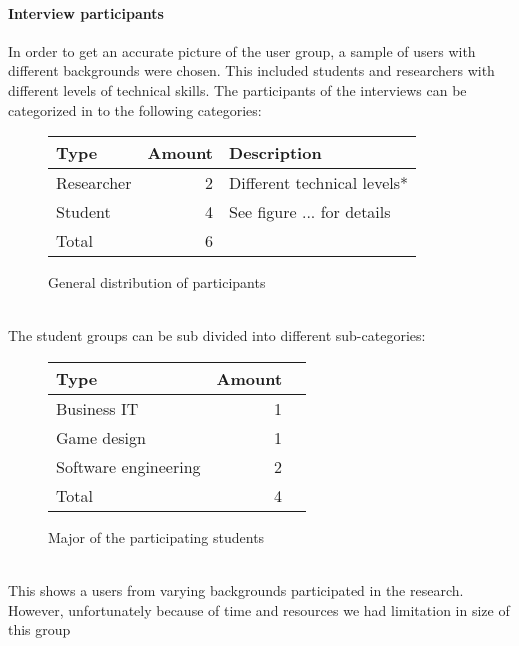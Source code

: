 \documentclass[conference]{IEEEtran}
\begin{document}
		\paragraph{Interview participants}
			In order to get an accurate picture of the user group, a sample of users with different backgrounds were chosen. This included students and researchers with different levels of technical skills. The participants of the interviews can be categorized in to the following categories:
			\begin{figure}[ht]
				\centering
				\begin{tabular}{ | l | r | l | }
					\hline
					Type			& Amount	& Description \\ \hline \hline
					Researcher		& 2			& Different technical levels* \\ \hline
					Student			& 4			& See figure ... for details \\ \hline \hline
					Total			& 6			& \\ \hline
				\end{tabular}
				\caption{General distribution of participants}
			\end{figure}\\
			The student groups can be sub divided into different sub-categories:
			\begin{figure}[ht]
				\centering
				\begin{tabular}{ | l | r | l | }
					\hline
					Type					& Amount \\ \hline \hline
					Business IT				& 1 \\ \hline
					Game design				& 1 \\ \hline
					Software engineering	& 2 \\ \hline
					Total					& 4 \\ \hline
				\end{tabular}
				\caption{Major of the participating students}
			\end{figure} \\
			This shows a users from varying backgrounds participated in the research. However, unfortunately because of time and resources we had limitation in size of this group
\end{document}
